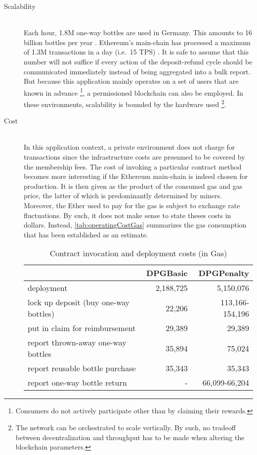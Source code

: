 \begin{description}
	\item[Scalability]
	\hfill \\
	Each hour, 1.8M one-way bottles are used in Germany. This amounts to 16 billion bottles per year \cite{DUHEinweg}. Ethereum's main-chain has processed a maximum of 1.3M transactions in a day (i.e.~15 TPS) \cite{etherscan}. It is safe to assume that this number will not suffice if every action of the deposit-refund cycle should be communicated immediately instead of being aggregated into a bulk report. But because this application mainly operates on a set of users that are known in advance \footnote{Consumers do not actively participate other than by claiming their rewards.}, a permissioned blockchain can also be employed. In these environments, scalability is bounded by the hardware used \footnote{The network can be orchestrated to scale vertically. By such, no tradeoff between decentralization and throughput has to be made when altering the blockchain parameters.}. 
	
	\item[Cost]
	\hfill \\
	In this application context, a private environment does not charge for transactions since the infrastructure costs are presumed to be covered by the membership fees. The cost of invoking a particular contract method becomes more interesting if the Ethereum main-chain is indeed chosen for production. It is then given as the product of the consumed gas and gas price, the latter of which is predominantly determined by miners. Moreover, the Ether used to pay for the gas is subject to exchange rate fluctuations. By such, it does not make sense to state theses costs in dollars. Instead, \autoref{tab:operatingCostGas} summarizes the gas consumption that has been established as an estimate.

	\begin{table}[hbt]
	\centering	
	\begin{tabular}{l|r|r}
    	& DPGBasic & DPGPenalty \\
    	\hline
    	deployment & 2,188,725 & 5,150,076 \\
    	\hline
    	lock up deposit (buy one-way bottles) & 22,206 & 113,166-154,196 \\ 
    	put in claim for reimbursement & 29,389 & 29,389 \\
    	report thrown-away one-way bottles & 35,894 & 75,024 \\
    	report reusable bottle purchase & 35,343 & 35,343 \\
    	\hline
    	report one-way bottle return & - & 66,099-66,204 \\
	\end{tabular}
	\caption[Contract invocation and deployment costs (in gas)]{Contract invocation and deployment costs (in Gas) \footnotemark}
	\label{tab:operatingCostGas}
	\end{table}
	
	\FloatBarrier

\end{description}
  
